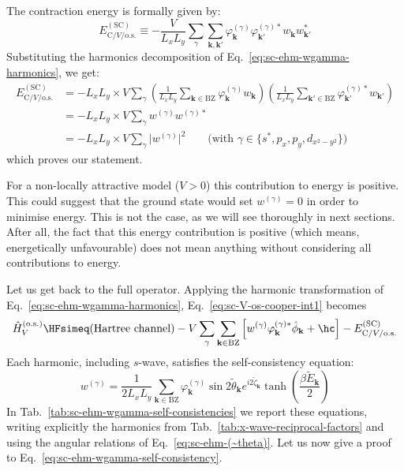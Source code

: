 \begin{tabproof}

	The contraction energy is formally given  by:
	\[
		E_{\mathrm{C}/V/\mathrm{o.s.}}^{(\mathrm{SC})} \equiv - \frac{V}{L_x L_y} \sum_\gamma \sum_{\mathbf{k}, \mathbf{k}'} \varphi_\mathbf{k}^{(\gamma)} \varphi_{\mathbf{k}'}^{(\gamma)*} w_\mathbf{k} w_{\mathbf{k}'}^*
	\]
	Substituting the harmonics decomposition of Eq.~\eqref{eq:sc-ehm-wgamma-harmonics}, we get:
	\[
	\begin{aligned}
		E_{\mathrm{C}/V/\mathrm{o.s.}}^{(\mathrm{SC})} & = - L_x L_y \times V \sum_\gamma \left(\frac{1}{L_x L_y} \sum_{\mathbf{k}\in\mathrm{BZ}} \varphi_\mathbf{k}^{(\gamma)} w_\mathbf{k} \right) \left(\frac{1}{L_x L_y} \sum_{\mathbf{k}'\in\mathrm{BZ}} \varphi_{\mathbf{k}'}^{(\gamma)*} w_{\mathbf{k}'} \right) \\
		&= - L_x L_y \times V \sum_\gamma  w^{(\gamma)}  w^{(\gamma)*}  \\
		&= - L_x L_y \times V \sum_\gamma \big| w^{(\gamma)} \big|^2
		\qquad
		\text{(with $\gamma \in \lbrace s^*, p_x, p_y, d_{x^2-y^2} \rbrace$)}
	\end{aligned}
	\]
	which proves our statement.
\end{tabproof}
%
For a non-locally attractive model ($V>0$) this contribution to energy is positive. This could suggest that the ground state would set $w^{(\gamma)}=0$ in order to minimise energy. This is not the case, as we will see thoroughly in next sections. After all, the fact that this energy contribution is positive (which means, energetically unfavourable) does not mean anything without considering all contributions to energy.

Let us get back to the full operator. Applying the harmonic transformation of Eq.~\eqref{eq:sc-ehm-wgamma-harmonics}, Eq.~\eqref{eq:sc-V-os-cooper-int1} becomes
\[	
	\hat H_V^{(\mathrm{o.s.})} \HFsimeq \text{(Hartree channel)}
	-V \sum_\gamma \sum_{\mathbf{k}\in\mathrm{BZ}}
	\left[
		w^{(\gamma)} \varphi_\mathbf{k}^{(\gamma)*} \hat \phi_\mathbf{k} + \hc 
	\right] - E_{\mathrm{C}/V/\mathrm{o.s.}}^{(\mathrm{SC})}
\]
Each harmonic, including $s$-wave, satisfies the self-consistency equation:
\begin{equation}\label{eq:sc-ehm-wgamma-self-consistency}
	w^{(\gamma)} = \frac{1}{2L_x L_y} 	\sum_{\mathbf{k}\in\mathrm{BZ}} \varphi_\mathbf{k}^{(\gamma)} \sin 2 \tilde{\theta}_\mathbf{k} e^{i 2\tilde{\zeta}_\mathbf{k}} \tanh(\frac{\beta \tilde{E}_\mathbf{k}}{2})
\end{equation}
In Tab.~\ref{tab:sc-ehm-wgamma-self-consistencies}
we report these equations, writing explicitly the harmonics from Tab.~\ref{tab:x-wave-reciprocal-factors} and using the angular relations of Eq.~\eqref{eq:sc-ehm-(~theta)}. Let us now give a proof to Eq.~\eqref{eq:sc-ehm-wgamma-self-consistency}.

